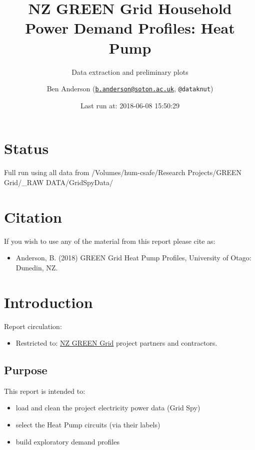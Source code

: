 \documentclass[]{article}
\title{NZ GREEN Grid Household Power Demand Profiles: Heat Pump}
\subtitle{Data extraction and preliminary plots}
\author{Ben Anderson
(\href{mailto:b.anderson@soton.ac.uk}{\nolinkurl{b.anderson@soton.ac.uk}},
\texttt{@dataknut})}
\date{Last run at: 2018-06-08 15:50:29}
\providecommand{\tightlist}{%
  \setlength{\itemsep}{0pt}\setlength{\parskip}{0pt}}
\begin{document}
\maketitle

{
\setcounter{tocdepth}{2}
\tableofcontents
}
\newpage

\section{Status}\label{status}

Full run using all data from /Volumes/hum-csafe/Research Projects/GREEN
Grid/\_RAW DATA/GridSpyData/

\section{Citation}\label{citation}

If you wish to use any of the material from this report please cite as:

\begin{itemize}
\tightlist
\item
  Anderson, B. (2018) GREEN Grid Heat Pump Profiles, University of
  Otago: Dunedin, NZ.
\end{itemize}

\newpage

\section{Introduction}\label{introduction}

Report circulation:

\begin{itemize}
\tightlist
\item
  Restricted to:
  \href{https://www.otago.ac.nz/centre-sustainability/research/energy/otago050285.html}{NZ
  GREEN Grid} project partners and contractors.
\end{itemize}

\subsection{Purpose}\label{purpose}

This report is intended to:

\begin{itemize}
\tightlist
\item
  load and clean the project electricity power data (Grid Spy)
\item
  select the Heat Pump circuits (via their labels)
\item
  build exploratory demand profiles
\end{itemize}
\end{document}
